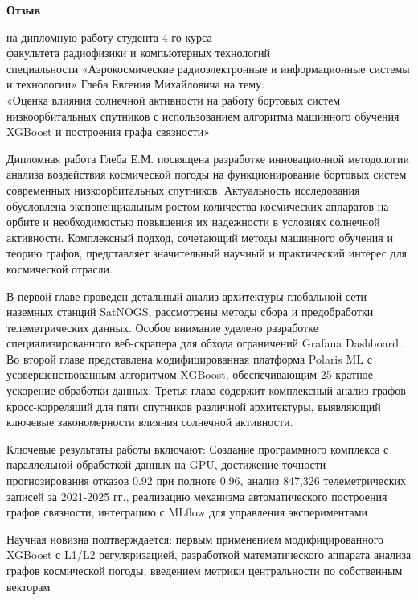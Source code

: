 \documentclass[14pt, a4paper]{bsu_review}
\begin{document}
\begin{center}
\textbf{Отзыв}
\end{center}

\begin{center}
\noindent на дипломную работу студента 4-го курса\\
факультета радиофизики и компьютерных технологий\\
специальности «Аэрокосмические радиоэлектронные и информационные системы и технологии» Глеба Евгения Михайловича на тему:\\
«Оценка влияния солнечной активности на работу бортовых систем низкоорбитальных спутников с использованием алгоритма машинного обучения XGBoost и построения графа связности»
\end{center}

Дипломная работа Глеба Е.М. посвящена разработке инновационной методологии анализа воздействия космической погоды на функционирование бортовых систем современных низкоорбитальных спутников. Актуальность исследования обусловлена экспоненциальным ростом количества космических аппаратов на орбите и необходимостью повышения их надежности в условиях солнечной активности. Комплексный подход, сочетающий методы машинного обучения и теорию графов, представляет значительный научный и практический интерес для космической отрасли.

В первой главе проведен детальный анализ архитектуры глобальной сети наземных станций SatNOGS, рассмотрены методы сбора и предобработки телеметрических данных. Особое внимание уделено разработке специализированного веб-скрапера для обхода ограничений Grafana Dashboard. Во второй главе представлена модифицированная платформа Polaris ML с усовершенствованным алгоритмом XGBoost, обеспечивающим 25-кратное ускорение обработки данных. Третья глава содержит комплексный анализ графов кросс-корреляций для пяти спутников различной архитектуры, выявляющий ключевые закономерности влияния солнечной активности.

Ключевые результаты работы включают:
Создание программного комплекса с параллельной обработкой данных на GPU,
достижение точности прогнозирования отказов 0.92 при полноте 0.96, анализ 847,326 телеметрических записей за 2021-2025 гг., реализацию механизма автоматического построения графов связности, интеграцию с MLflow для управления экспериментами

Научная новизна подтверждается:
первым применением модифицированного XGBoost с L1/L2 регуляризацией, разработкой математического аппарата анализа графов космической погоды, введением метрики центральности по собственным векторам
\end{document}
